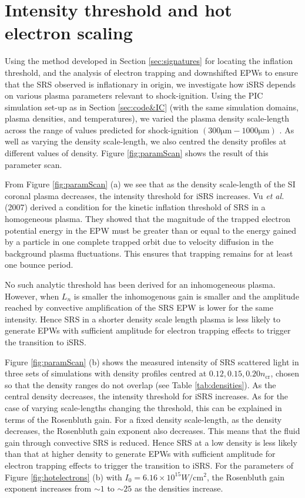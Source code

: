\section{Intensity threshold and hot electron scaling}\label{sec:paramScan}
Using the method developed in Section \ref{sec:signatures} for locating the inflation threshold, and the analysis of electron trapping and downshifted EPWs to ensure that the SRS observed is inflationary in origin, we investigate how iSRS depends on various plasma parameters relevant to shock-ignition. Using the PIC simulation set-up as in Section \ref{sec:code&IC} (with the same simulation domains, plasma densities, and temperatures), we varied the plasma density scale-length across the range
of values predicted for shock-ignition $(300\si{\micro\metre} - 1000\si{\micro\metre})$ \cite{Ribeyre2009}. As well as varying the density scale-length, we also centred the density profiles at different values of density. Figure \ref{fig:paramScan} shows the result of this parameter scan.

From Figure \ref{fig:paramScan} (a) we see that as the density scale-length of the SI coronal plasma decreases, the intensity threshold for iSRS increases. Vu \textit{et al.} (2007) \cite{Vu2007} derived a condition for the kinetic inflation threshold of SRS in a homogeneous plasma. They showed that the magnitude of the trapped electron potential energy in the EPW must be greater than or equal to the energy gained by a particle in one complete trapped orbit due to velocity diffusion in the
background plasma fluctuations. This ensures that trapping remains for at least one bounce period.

No such analytic threshold has been derived for an inhomogeneous plasma.
However, when $L_n$ is smaller the inhomogenous gain is smaller and the amplitude reached by convective amplification of the SRS EPW is lower for the same intensity.
Hence SRS in a shorter density scale length plasma is less likely to generate EPWs with sufficient amplitude for electron trapping effects to trigger the transition to iSRS.

Figure \ref{fig:paramScan} (b) shows the measured intensity of SRS scattered light in three sets of simulations with density profiles centred at $0.12,0.15,0.20 n_\mathrm{cr}$, chosen so that the density ranges do not overlap (see Table \ref{tab:densities}). As the central density decreases, the intensity threshold for iSRS increases. As for the case of varying scale-lengths changing the threshold, this can be explained in terms of the Rosenbluth gain\cite{Rosenbluth1972}. For a fixed density scale-length, as the density decreases, the Rosenbluth gain exponent also decreases. This means that the fluid gain through convective SRS is reduced. Hence SRS at a low density is less likely than that at higher density to generate EPWs with sufficient amplitude for electron trapping effects to trigger the transition to iSRS. For the parameters of Figure \ref{fig:hotelectrons} (b) with $I_0 = 6.16\times 10^{15} \si{W / \centi \metre^2}$, the Rosenbluth gain exponent increases from $\sim1$ to $\sim25$ as the densities increase.

